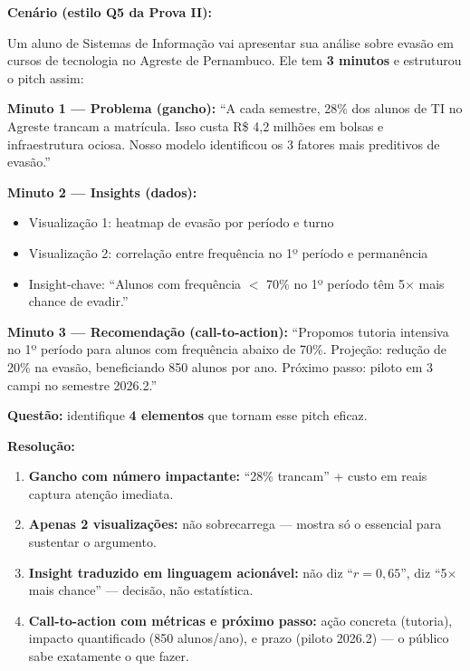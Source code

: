 \begin{SolvedBox}
\textbf{Cenário (estilo Q5 da Prova II):}

Um aluno de Sistemas de Informação vai apresentar sua análise sobre
evasão em cursos de tecnologia no Agreste de Pernambuco. Ele tem
\textbf{3 minutos} e estruturou o pitch assim:

\textbf{Minuto 1 — Problema (gancho):}
``A cada semestre, 28\% dos alunos de TI no Agreste trancam a matrícula.
Isso custa R\$ 4,2 milhões em bolsas e infraestrutura ociosa. Nosso
modelo identificou os 3 fatores mais preditivos de evasão.''

\textbf{Minuto 2 — Insights (dados):}
\begin{itemize}
  \item Visualização 1: heatmap de evasão por período e turno
  \item Visualização 2: correlação entre frequência no 1º período e
  permanência
  \item Insight-chave: ``Alunos com frequência $<$ 70\% no 1º período
  têm 5$\times$ mais chance de evadir.''
\end{itemize}

\textbf{Minuto 3 — Recomendação (call-to-action):}
``Propomos tutoria intensiva no 1º período para alunos com frequência
abaixo de 70\%. Projeção: redução de 20\% na evasão, beneficiando
850 alunos por ano. Próximo passo: piloto em 3 campi no semestre 2026.2.''

\textbf{Questão:} identifique \textbf{4 elementos} que tornam esse
pitch eficaz.

\textbf{Resolução:}
\begin{enumerate}
  \item \textbf{Gancho com número impactante:} ``28\% trancam''
  + custo em reais captura atenção imediata.
  \item \textbf{Apenas 2 visualizações:} não sobrecarrega — mostra
  só o essencial para sustentar o argumento.
  \item \textbf{Insight traduzido em linguagem acionável:} não diz
  ``$r = 0{,}65$'', diz ``5$\times$ mais chance'' — decisão, não
  estatística.
  \item \textbf{Call-to-action com métricas e próximo passo:}
  ação concreta (tutoria), impacto quantificado (850 alunos/ano),
  e prazo (piloto 2026.2) — o público sabe exatamente o que fazer.
\end{enumerate}
\end{SolvedBox}

